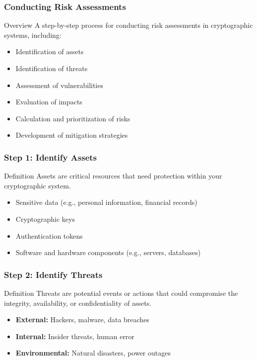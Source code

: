 \documentclass{beamer}
\begin{document}
\begin{frame}[fragile]
    \frametitle{Conducting Risk Assessments}
    \begin{block}{Overview}
        A step-by-step process for conducting risk assessments in cryptographic systems, including:
        \begin{itemize}
            \item Identification of assets
            \item Identification of threats
            \item Assessment of vulnerabilities
            \item Evaluation of impacts
            \item Calculation and prioritization of risks
            \item Development of mitigation strategies
        \end{itemize}
    \end{block}
\end{frame}

\begin{frame}[fragile]
    \frametitle{Step 1: Identify Assets}
    \begin{block}{Definition}
        Assets are critical resources that need protection within your cryptographic system.
    \end{block}
    \begin{itemize}
        \item Sensitive data (e.g., personal information, financial records)
        \item Cryptographic keys
        \item Authentication tokens
        \item Software and hardware components (e.g., servers, databases)
    \end{itemize}
\end{frame}

\begin{frame}[fragile]
    \frametitle{Step 2: Identify Threats}
    \begin{block}{Definition}
        Threats are potential events or actions that could compromise the integrity, availability, or confidentiality of assets.
    \end{block}
    \begin{itemize}
        \item \textbf{External:} Hackers, malware, data breaches
        \item \textbf{Internal:} Insider threats, human error
        \item \textbf{Environmental:} Natural disasters, power outages
    \end{itemize}
\end{frame}
\end{document}
